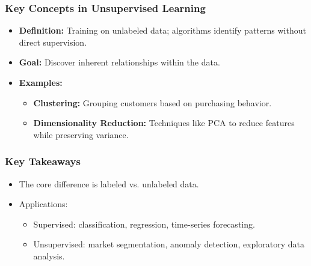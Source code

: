 \documentclass[aspectratio=169]{beamer}
\begin{document}
\begin{frame}[fragile]
    \frametitle{Key Concepts in Unsupervised Learning}
    \begin{itemize}
        \item \textbf{Definition:} Training on unlabeled data; algorithms identify patterns without direct supervision.
        \item \textbf{Goal:} Discover inherent relationships within the data.
        \item \textbf{Examples:}
        \begin{itemize}
            \item \textbf{Clustering:} Grouping customers based on purchasing behavior.
            \item \textbf{Dimensionality Reduction:} Techniques like PCA to reduce features while preserving variance.
        \end{itemize}
    \end{itemize}
\end{frame}

\begin{frame}[fragile]
    \frametitle{Key Takeaways}
    \begin{itemize}
        \item The core difference is labeled vs. unlabeled data.
        \item Applications:
        \begin{itemize}
            \item Supervised: classification, regression, time-series forecasting.
            \item Unsupervised: market segmentation, anomaly detection, exploratory data analysis.
        \end{itemize}
    \end{itemize}
\end{frame}
\end{document}
